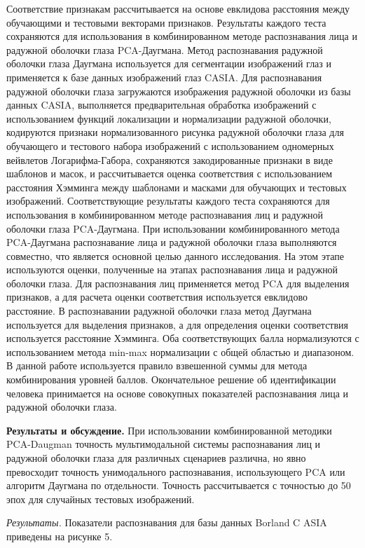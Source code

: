 Соответствие признакам рассчитывается на основе евклидова расстояния
между обучающими и тестовыми векторами признаков. Результаты каждого
теста сохраняются для использования в комбинированном методе
распознавания лица и радужной оболочки глаза PCA-Даугмана. Метод
распознавания радужной оболочки глаза Даугмана используется для
сегментации изображений глаз и применяется к базе данных изображений
глаз CASIA. Для распознавания радужной оболочки глаза загружаются
изображения радужной оболочки из базы данных CASIA, выполняется
предварительная обработка изображений с использованием функций
локализации и нормализации радужной оболочки, кодируются признаки
нормализованного рисунка радужной оболочки глаза для обучающего и
тестового набора изображений с использованием одномерных вейвлетов
Логарифма-Габора, сохраняются закодированные признаки в виде шаблонов и
масок, и рассчитывается оценка соответствия с использованием расстояния
Хэмминга между шаблонами и масками для обучающих и тестовых изображений.
Соответствующие результаты каждого теста сохраняются для использования в
комбинированном методе распознавания лиц и радужной оболочки глаза
PCA-Даугмана. При использовании комбинированного метода PCA-Даугмана
распознавание лица и радужной оболочки глаза выполняются совместно, что
является основной целью данного исследования. На этом этапе используются
оценки, полученные на этапах распознавания лица и радужной оболочки
глаза. Для распознавания лиц применяется метод PCA для выделения
признаков, а для расчета оценки соответствия используется евклидово
расстояние. В распознавании радужной оболочки глаза метод Даугмана
используется для выделения признаков, а для определения оценки
соответствия используется расстояние Хэмминга. Оба соответствующих балла
нормализуются с использованием метода min-max нормализации с общей
областью и диапазоном. В данной работе используется правило взвешенной
суммы для метода комбинирования уровней баллов. Окончательное решение об
идентификации человека принимается на основе совокупных показателей
распознавания лица и радужной оболочки глаза.

{\bfseries Результаты и обсуждение.} При использовании комбинированной
методики PCA-Daugman точность мультимодальной системы распознавания лиц
и радужной оболочки глаза для различных сценариев различна, но явно
превосходит точность унимодального распознавания, использующего PCA или
алгоритм Даугмана по отдельности. Точность рассчитывается с точностью до
50 эпох для случайных тестовых изображений.

\emph{Результаты.} Показатели распознавания для базы данных Borland C
ASIA приведены на рисунке 5.

